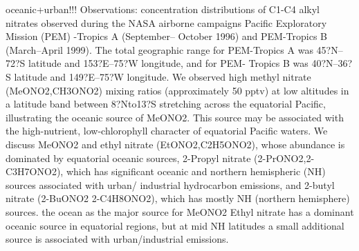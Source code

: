 \documentclass[11pt,a4paper]{article}
\begin{document}
\citep{Blake2003} oceanic+urban!!!
Observations: concentration distributions of C1-C4 alkyl nitrates observed during the NASA airborne campaigns Pacific Exploratory Mission (PEM) -Tropics A (September– October 1996) and PEM-Tropics B (March–April 1999). The total geographic range for PEM-Tropics A was 45?N–72?S latitude and 153?E–75?W longitude, and for PEM- Tropics B was 40?N–36?S latitude and 149?E–75?W longitude. We observed high methyl nitrate (MeONO2,CH3ONO2) mixing ratios (approximately 50 pptv) at low altitudes in a latitude band between 8?Nto13?S stretching across the equatorial Pacific, illustrating the oceanic source of MeONO2. This source may be associated with the high-nutrient, low-chlorophyll character of equatorial Pacific waters. We discuss MeONO2 and ethyl nitrate (EtONO2,C2H5ONO2), whose abundance is dominated by equatorial oceanic sources, 2-Propyl nitrate (2-PrONO2,2-C3H7ONO2), which has significant oceanic and northern hemispheric (NH) sources associated with urban/ industrial hydrocarbon emissions, and 2-butyl nitrate (2-BuONO2 2-C4H8ONO2), which has mostly NH (northern hemisphere) sources.
the ocean as the major source for MeONO2
Ethyl nitrate has a dominant oceanic source in equatorial regions, but at mid NH latitudes a small additional source is associated with urban/industrial emissions.
\end{document}
